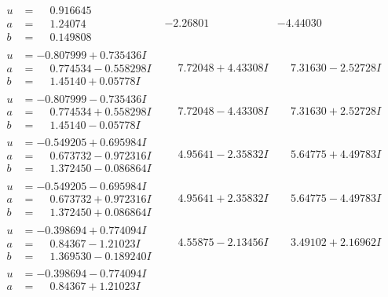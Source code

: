 \documentclass[1p]{elsarticle_modified}
\theoremstyle{definition}
\begin{document}
$$\begin{array}{c|c|c}
\begin{aligned}
u &= \phantom{-}0.916645\phantom{ +0.000000I} \\
a &= \phantom{-}1.24074\phantom{ +0.000000I} \\
b &= \phantom{-}0.149808\phantom{ +0.000000I}\end{aligned}
 & -2.26801\phantom{ +0.000000I} & -4.44030\phantom{ +0.000000I} \\ \hline\begin{aligned}
u &= -0.807999 + 0.735436 I \\
a &= \phantom{-}0.774534 - 0.558298 I \\
b &= \phantom{-}1.45140 + 0.05778 I\end{aligned}
 & \phantom{-}7.72048 + 4.43308 I & \phantom{-}7.31630 - 2.52728 I \\ \hline\begin{aligned}
u &= -0.807999 - 0.735436 I \\
a &= \phantom{-}0.774534 + 0.558298 I \\
b &= \phantom{-}1.45140 - 0.05778 I\end{aligned}
 & \phantom{-}7.72048 - 4.43308 I & \phantom{-}7.31630 + 2.52728 I \\ \hline\begin{aligned}
u &= -0.549205 + 0.695984 I \\
a &= \phantom{-}0.673732 - 0.972316 I \\
b &= \phantom{-}1.372450 - 0.086864 I\end{aligned}
 & \phantom{-}4.95641 - 2.35832 I & \phantom{-}5.64775 + 4.49783 I \\ \hline\begin{aligned}
u &= -0.549205 - 0.695984 I \\
a &= \phantom{-}0.673732 + 0.972316 I \\
b &= \phantom{-}1.372450 + 0.086864 I\end{aligned}
 & \phantom{-}4.95641 + 2.35832 I & \phantom{-}5.64775 - 4.49783 I \\ \hline\begin{aligned}
u &= -0.398694 + 0.774094 I \\
a &= \phantom{-}0.84367 - 1.21023 I \\
b &= \phantom{-}1.369530 - 0.189240 I\end{aligned}
 & \phantom{-}4.55875 - 2.13456 I & \phantom{-}3.49102 + 2.16962 I \\ \hline\begin{aligned}
u &= -0.398694 - 0.774094 I \\
a &= \phantom{-}0.84367 + 1.21023 I \\

\end{aligned}
\end{array}$$
\end{document}
